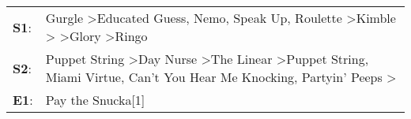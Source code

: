 \begin{supertabular}{p{0.03\textwidth}p{0.92\textwidth}}
 \textbf{S1}:  &  Gurgle\textsuperscript{} \textgreater \enspace Educated Guess\textsuperscript{}, \enspace Nemo\textsuperscript{}, \enspace Speak Up\textsuperscript{}, \enspace Roulette\textsuperscript{} \textgreater \enspace Kimble\textsuperscript{} \textgreater {}\textsuperscript{} \textgreater \enspace Glory\textsuperscript{} \textgreater \enspace Ringo\textsuperscript{}  \enspace  \\
 \textbf{S2}:  &  Puppet String\textsuperscript{} \textgreater \enspace Day Nurse\textsuperscript{} \textgreater \enspace The Linear\textsuperscript{} \textgreater \enspace Puppet String\textsuperscript{}, \enspace Miami Virtue\textsuperscript{}, \enspace Can't You Hear Me Knocking\textsuperscript{}, \enspace Partyin' Peeps\textsuperscript{} \textgreater {}\textsuperscript{}  \enspace  \\
 \textbf{E1}:  &                                                                                                                                                                                                                                                                                                                                                 Pay the Snucka[1]\textsuperscript{}  \enspace  \\
\end{supertabular}
